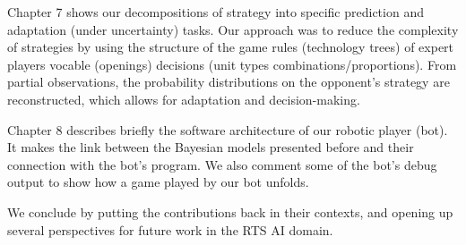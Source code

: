 Chapter 7 shows our decompositions of strategy into specific prediction and adaptation (under uncertainty) tasks. Our approach was to reduce the complexity of strategies by using the structure of the game rules (technology trees) of expert players vocable (openings) decisions (unit types combinations/proportions). From partial observations, the probability distributions on the opponent's strategy are reconstructed, which allows for adaptation and decision-making.

Chapter 8 describes briefly the software architecture of our robotic player (bot). It makes the link between the Bayesian models presented before and their connection with the bot's program. We also comment some of the bot's debug output to show how a game played by our bot unfolds.

We conclude by putting the contributions back in their contexts, and opening up several perspectives for future work in the RTS AI domain.



